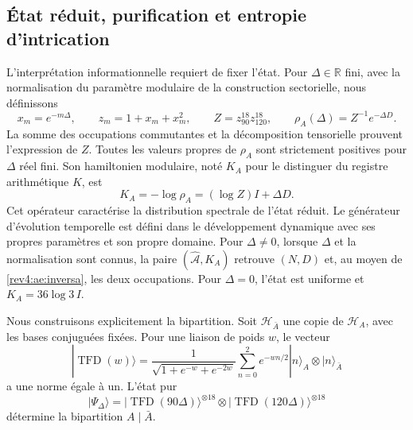 \subsection{État réduit, purification et entropie d'intrication}

L'interprétation informationnelle requiert de fixer l'état. Pour \(\Delta\in\mathbb R\) fini, avec la normalisation du paramètre modulaire de la construction sectorielle, nous définissons
\begin{equation}
 x_m=e^{-m\Delta},\qquad z_m=1+x_m+x_m^2,
 \qquad Z=z_{90}^{18}z_{120}^{18},
 \qquad \rho_A(\Delta)=Z^{-1}e^{-\Delta D}.
 \label{rev4:ae:rho}
\end{equation}
La somme des occupations commutantes et la décomposition tensorielle prouvent
l’expression de \(Z\). Toutes les valeurs propres de \(\rho_A\) sont
strictement positives pour \(\Delta\) réel fini. Son hamiltonien
modulaire, noté \(K_A\) pour le distinguer du registre arithmétique
\(K\), est
\begin{equation}
 K_A=-\log\rho_A=(\log Z)I+\Delta D.
 \label{rev4:ae:modular}
\end{equation}
Cet opérateur caractérise la distribution spectrale de l’état réduit.
Le générateur d’évolution temporelle est défini dans le développement dynamique
avec ses propres paramètres et son propre domaine. Pour \(\Delta\ne0\), lorsque
\(\Delta\) et la normalisation sont connus, la paire
\((\widehat{\mathcal A},K_A)\) retrouve \((N,D)\) et, au moyen de
\eqref{rev4:ae:inversa}, les deux occupations. Pour \(\Delta=0\),
l’état est uniforme et \(K_A=36\log3\,I\).

Nous construisons explicitement la bipartition. Soit \(\mathscr H_{\bar A}\) une copie de \(\mathscr H_A\), avec les bases conjuguées fixées. Pour une liaison de poids \(w\), le vecteur
\[
 |\operatorname{TFD}(w)\rangle
 =\frac1{\sqrt{1+e^{-w}+e^{-2w}}}
 \sum_{n=0}^{2}e^{-wn/2}|n\rangle_A\otimes|n\rangle_{\bar A}
\]
a une norme égale à un. L'état pur
\begin{equation}
 |\Psi_\Delta\rangle
 =|\operatorname{TFD}(90\Delta)\rangle^{\otimes18}
  \otimes|\operatorname{TFD}(120\Delta)\rangle^{\otimes18}
 \label{rev4:ae:tfd}
\end{equation}
détermine la bipartition \(A\mid\bar A\).

